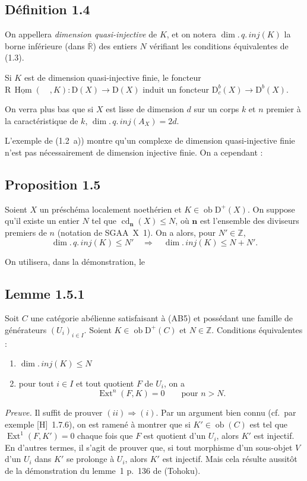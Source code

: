\documentclass[11pt]{article}
\DeclareMathOperator{\Hom}{Hom}
\DeclareMathOperator{\Ext}{Ext}
\DeclareMathOperator{\cd}{cd}
\newcommand{\R}{\mathrm{R}}\newcommand{\RHomCore}{\mathrm{RHom}}
\newcommand{\D}{\mathrm{D}}
\newcommand{\Z}{\mathbb{Z}}
\newcommand{\ob}{\operatorname{ob}}
\providecommand{\Hom}{\operatorname{Hom}}
\providecommand{\ob}{\operatorname{ob}}
\providecommand{\R}{\mathrm R}
\providecommand{\Z}{\mathbb Z}
\providecommand{\Hom}{\operatorname{Hom}}
\begin{document}
\subsection*{Définition 1.4}
On appellera \emph{dimension quasi-injective} de $K$, et on notera $\dim.\,q.\,inj(K)$ la borne inférieure (dans $\overline{\mathbb{R}}$) des entiers $N$ vérifiant les conditions équivalentes de (1.3).

Si $K$ est de dimension quasi-injective finie, le foncteur $\R\,\underline{\Hom}(\quad,K) : \D(X) \to \D(X)$ induit un foncteur $\D_c^{b}(X) \to \D^{b}(X)$.

On verra plus bas que si $X$ est lisse de dimension $d$ sur un corps $k$ et $n$ premier à la caractéristique de $k$, $\dim.\,q.\,inj(A_X) = 2d$.

L'exemple de (1.2~a)) montre qu'un complexe de dimension quasi-injective finie n'est pas nécessairement de dimension injective finie. On a cependant :

\subsection*{Proposition 1.5}
Soient $X$ un préschéma localement noethérien et $K \in \ob \D^{+}(X)$. On suppose qu'il existe un entier $N$ tel que $\cd_{\mathbf{n}}(X) \leqslant N$, où $\mathbf{n}$ est l'ensemble des diviseurs premiers de $n$ (notation de SGAA~X~1). On a alors, pour $N' \in \Z$,
\[
\dim.\,q.\,inj(K) \leqslant N' \quad \Longrightarrow \quad \dim.\,inj(K) \leqslant N + N'.
\]

On utilisera, dans la démonstration, le

\subsection*{Lemme 1.5.1}
Soit $C$ une catégorie abélienne satisfaisant à (AB5) et possédant une famille de générateurs $(U_i)_{i \in I}$. Soient $K \in \ob \D^{+}(C)$ et $N \in \Z$. Conditions équivalentes :
\begin{enumerate}[label=(\roman*)]
\item $\dim.\,inj(K) \leqslant N$
\item pour tout $i \in I$ et tout quotient $F$ de $U_i$, on a
\[
\Ext^n(F,K) = 0 \qquad \text{pour } n > N.
\]
\end{enumerate}

\emph{Preuve.} Il suffit de prouver $(ii) \Rightarrow (i)$. Par un argument bien connu (cf.\ par exemple [H]~1.7.6), on est ramené à montrer que si $K' \in \ob(C)$ est tel que $\Ext^1(F,K') = 0$ chaque fois que $F$ est quotient d'un $U_i$, alors $K'$ est injectif. En d'autres termes, il s'agit de prouver que, si tout morphisme d'un sous-objet $V$ d'un $U_i$ dans $K'$ se prolonge à $U_i$, alors $K'$ est injectif. Mais cela résulte aussitôt de la démonstration du lemme~1 p.~136 de (Tohoku).
\end{document}
